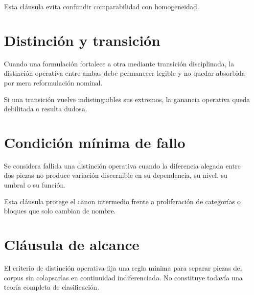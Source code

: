 \begin{observation}
Esta cláusula evita confundir comparabilidad con homogeneidad.
\end{observation}

\section{Distinción y transición}
\begin{definition}
Cuando una formulación fortalece a otra mediante transición disciplinada, la distinción operativa entre ambas debe permanecer legible y no quedar absorbida por mera reformulación nominal.
\end{definition}

\begin{observation}
Si una transición vuelve indistinguibles sus extremos, la ganancia operativa queda debilitada o resulta dudosa.
\end{observation}

\section{Condición mínima de fallo}
\begin{definition}
Se considera fallida una distinción operativa cuando la diferencia alegada entre dos piezas no produce variación discernible en su dependencia, su nivel, su umbral o su función.
\end{definition}

\begin{observation}
Esta cláusula protege el canon intermedio frente a proliferación de categorías o bloques que solo cambian de nombre.
\end{observation}

\section{Cláusula de alcance}
\begin{observation}
El criterio de distinción operativa fija una regla mínima para separar piezas del corpus sin colapsarlas en continuidad indiferenciada. No constituye todavía una teoría completa de clasificación.
\end{observation}

